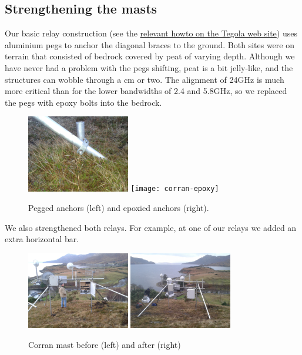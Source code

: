 \subsection{Strengthening the masts}
\label{december-2013-january-2014-strengthening-the-relays}

Our basic relay construction (see the
\href{http://www.tegola.org.uk/howto/relay-construction.html}{relevant
  howto on the Tegola web site}) uses aluminium pegs to anchor the
diagonal braces to the ground. Both sites were on terrain that
consisted of bedrock covered by peat of varying depth. Although we
have never had a problem with the pegs shifting, peat is a bit
jelly-like, and the structures can wobble through a cm or two. The
alignment of 24GHz is much more critical than for the lower bandwidths
of 2.4 and 5.8GHz, so we replaced the pegs with epoxy bolts into the
bedrock.
\begin{figure}[h]
\includegraphics[width=0.4\textwidth]{corran-peg}
\texttt{[image: corran-epoxy]}
\caption{Pegged anchors (left) and epoxied anchors (right).}
\end{figure}

We also strengthened both relays. For example, at one of our relays we
added an extra horizontal bar.

\begin{figure}[h]
\includegraphics[width=0.4\textwidth]{corran-before-from-behind}
\includegraphics[width=0.4\textwidth]{corran-after-from-behind}
\caption{Corran mast before (left) and after (right)}
\end{figure}

